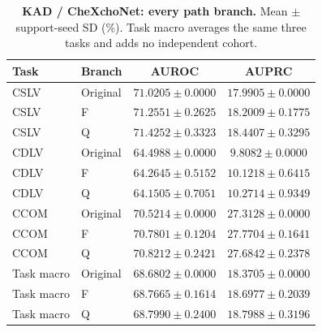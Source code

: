 \begin{table}[tp]
\centering
\caption{\textbf{KAD / CheXchoNet: every path branch.} Mean $\pm$ support-seed SD (\%). Task macro averages the same three tasks and adds no independent cohort.}
\label{tab:supp-cardiac-path-kad}
\small
\setlength{\tabcolsep}{4pt}
\begin{tabular*}{\textwidth}{@{\extracolsep{\fill}}llcc@{}}
\toprule
Task & Branch & AUROC & AUPRC \\
\midrule
CSLV & Original & $71.0205\pm0.0000$ & $17.9905\pm0.0000$ \\
CSLV & F & $71.2551\pm0.2625$ & $18.2009\pm0.1775$ \\
CSLV & Q & $71.4252\pm0.3323$ & $18.4407\pm0.3295$ \\
CDLV & Original & $64.4988\pm0.0000$ & $9.8082\pm0.0000$ \\
CDLV & F & $64.2645\pm0.5152$ & $10.1218\pm0.6415$ \\
CDLV & Q & $64.1505\pm0.7051$ & $10.2714\pm0.9349$ \\
CCOM & Original & $70.5214\pm0.0000$ & $27.3128\pm0.0000$ \\
CCOM & F & $70.7801\pm0.1204$ & $27.7704\pm0.1641$ \\
CCOM & Q & $70.8212\pm0.2421$ & $27.6842\pm0.2378$ \\
Task macro & Original & $68.6802\pm0.0000$ & $18.3705\pm0.0000$ \\
Task macro & F & $68.7665\pm0.1614$ & $18.6977\pm0.2039$ \\
Task macro & Q & $68.7990\pm0.2400$ & $18.7988\pm0.3196$ \\
\bottomrule
\end{tabular*}
\end{table}

